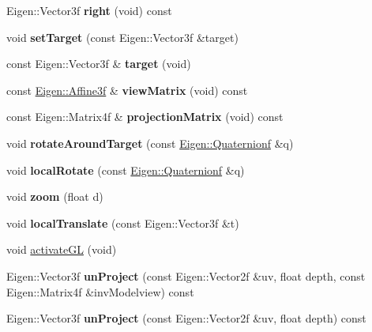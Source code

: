 \begin{DoxyCompactItemize}
Eigen\+::\+Vector3f {\bfseries right} (void) const
\item 
\mbox{\label{class_camera_a098f0009be2dbd2068472154d281ad7a}} 
void {\bfseries set\+Target} (const Eigen\+::\+Vector3f \&target)
\item 
\mbox{\label{class_camera_a265692fc1c8263a6fcd0be857fce27ff}} 
const Eigen\+::\+Vector3f \& {\bfseries target} (void)
\item 
\mbox{\label{class_camera_a510bb8db7020898bfe18405bd2949f37}} 
const \hyperlink{group___geometry___module_ga17e901de8ff882aea7845c5457db6a4f}{Eigen\+::\+Affine3f} \& {\bfseries view\+Matrix} (void) const
\item 
\mbox{\label{class_camera_ad2d3ea1b764470d92658ee5639b4872c}} 
const Eigen\+::\+Matrix4f \& {\bfseries projection\+Matrix} (void) const
\item 
\mbox{\label{class_camera_af0243aa90deb97bdab8592a634e6a6cd}} 
void {\bfseries rotate\+Around\+Target} (const \hyperlink{group___geometry___module_ga785b13a5a87f9bf55d4eba51ead2dcf0}{Eigen\+::\+Quaternionf} \&q)
\item 
\mbox{\label{class_camera_a33f874756ce3f26b661124a13aa0da2c}} 
void {\bfseries local\+Rotate} (const \hyperlink{group___geometry___module_ga785b13a5a87f9bf55d4eba51ead2dcf0}{Eigen\+::\+Quaternionf} \&q)
\item 
\mbox{\label{class_camera_aa84058b9c5940e96ffd36b7cc3eb3234}} 
void {\bfseries zoom} (float d)
\item 
\mbox{\label{class_camera_ac648e90b5b31e2eb26dc3cb8594dc502}} 
void {\bfseries local\+Translate} (const Eigen\+::\+Vector3f \&t)
\item 
void \hyperlink{class_camera_a4872379b01876af2ffd8d2d871472ed1}{activate\+GL} (void)
\item 
\mbox{\label{class_camera_acb7561ec2c581385a86fa5adacc096ab}} 
Eigen\+::\+Vector3f {\bfseries un\+Project} (const Eigen\+::\+Vector2f \&uv, float depth, const Eigen\+::\+Matrix4f \&inv\+Modelview) const
\item 
\mbox{\label{class_camera_a38f070824241e555744a9ce14601c30e}} 
Eigen\+::\+Vector3f {\bfseries un\+Project} (const Eigen\+::\+Vector2f \&uv, float depth) const
\end{DoxyCompactItemize}
